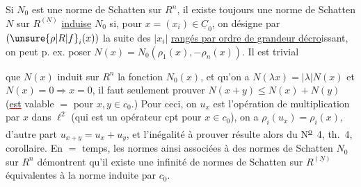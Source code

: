 {\reversemarginpar{}}
Si $N_0$ est une norme de Schatten  sur $R^n$, il existe toujours une norme de Schatten $N$ sur $R^{(\underline N)}$ 
{\reversemarginpar{}}
{\color{red}\uline{\color{black}induise}} $N_0$ si, pour  $x=(x_i)\in\underline{C}_0$, on désigne par
{\reversemarginpar{}}
$(\unsure{\rho|R|f}_i(x))$ la suite des $|x_i|$ 
{\color{red}\uline{\color{black}rangés par ordre de grandeur décro}}issant, on peut p. ex. poser $N(x)=N_0(\rho_1(x),\mathord{-}\rho_n(x))$. Il est trivial

{\reversemarginpar{}}


\reversemarginpar
{}
\normalmarginpar

que $N(x)$ induit sur $R^n$ la fonction $N_0(x)$, et qu'on a $N(\lambda x)=|\lambda|N(x)$ et $N(x)=0\Rightarrow x=0$, il faut seulement prouver $N(x+y)\leq N(x)+N(y)$ (\textcolor{red}{\uline{\textcolor{black}{est}}} valable $=$ pour $x,y\in c_0$.) Pour ceci, on  $u_x$ est l'opération de multiplication par $x$ dans $\ell^2$ (qui est un opérateur cpt pour $x\in c_0$), on a  $\rho_i(u_x)=\rho_i(x)$, d'autre part  $u_{x+y}=u_x+u_y$, et l'inégalité à prouver résulte alors du N\textsuperscript{\uline{o}}~4, th.~4, corollaire. En $=$ temps, les normes  ainsi associées à des normes  de Schatten $N_0$ sur $R^n$  démontrent qu'il existe une infinité  de normes de Schatten sur $R^{(\underline N)}$ équivalentes à la norme induite par $c_0$.

